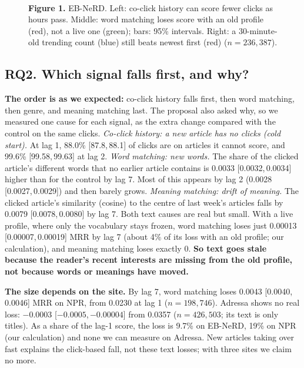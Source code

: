 \documentclass[11pt,a4paper]{article}
\newcommand{\ci}[2]{[#1,\,#2]}
\begin{document}
\begin{figure}[h]
\\[2pt]
{\small \textbf{Figure 1.} EB-NeRD. Left: co-click history can score fewer clicks as hours pass. Middle: word matching loses score with an old profile (red), not a live one (green); bars: 95\% intervals. Right: a 30-minute-old trending count (blue) still beats newest first (red) ($n=236{,}387$).}
\end{figure}

\subsection{RQ2. Which signal falls first, and why?}
\textbf{The order is as we expected:} co-click history falls first, then word matching, then genre, and meaning matching last. The proposal also asked why, so we measured one cause for each signal, as the extra change compared with the control on the same clicks. \emph{Co-click history: a new article has no clicks (cold start).} At lag 1, 88.0\% \ci{87.8}{88.1} of clicks are on articles it cannot score, and 99.6\% \ci{99.58}{99.63} at lag 2. \emph{Word matching: new words.} The share of the clicked article's different words that no earlier article contains is 0.0033 \ci{0.0032}{0.0034} higher than for the control by lag 7. Most of this appears by lag 2 (0.0028 \ci{0.0027}{0.0029}) and then barely grows. \emph{Meaning matching: drift of meaning.} The clicked article's similarity (cosine) to the centre of last week's articles falls by 0.0079 \ci{0.0078}{0.0080} by lag 7. Both text causes are real but small. With a live profile, where only the vocabulary stays frozen, word matching loses just 0.00013 \ci{0.00007}{0.00019} MRR by lag 7 (about 4\% of its loss with an old profile; our calculation), and meaning matching loses exactly 0. \textbf{So text goes stale because the reader's recent interests are missing from the old profile, not because words or meanings have moved.}

\textbf{The size depends on the site.} By lag 7, word matching loses 0.0043 \ci{0.0040}{0.0046} MRR on NPR, from 0.0230 at lag 1 ($n=198{,}746$). Adressa shows no real loss: $-0.0003$ \ci{$-0.0005$}{$-0.00004$} from 0.0357 ($n=426{,}503$; its text is only titles). As a share of the lag-1 score, the loss is 9.7\% on EB-NeRD, 19\% on NPR (our calculation) and none we can measure on Adressa. New articles taking over fast explains the click-based fall, not these text losses; with three sites we claim no more.
\end{document}

